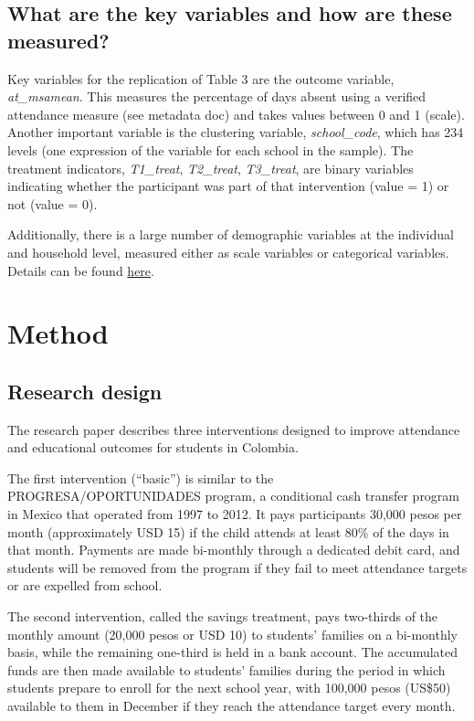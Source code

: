 \documentclass[
]{article}
\begin{document}
\hypertarget{what-are-the-key-variables-and-how-are-these-measured}{%
\subsection{What are the key variables and how are these
measured?}\label{what-are-the-key-variables-and-how-are-these-measured}}

Key variables for the replication of Table 3 are the outcome variable,
\emph{at\_msamean}. This measures the percentage of days absent using a
verified attendance measure (see metadata doc) and takes values between
0 and 1 (scale). Another important variable is the clustering variable,
\emph{school\_code}, which has 234 levels (one expression of the
variable for each school in the sample). The treatment indicators,
\emph{T1\_treat}, \emph{T2\_treat}, \emph{T3\_treat}, are binary
variables indicating whether the participant was part of that
intervention (value = 1) or not (value = 0).

Additionally, there is a large number of demographic variables at the
individual and household level, measured either as scale variables or
categorical variables. Details can be found
\href{./AEJApp_2010-0132_Data_ReadMe.pdf}{here}.

\hypertarget{method}{%
\section{Method}\label{method}}

\hypertarget{research-design}{%
\subsection{Research design}\label{research-design}}

The research paper describes three interventions designed to improve
attendance and educational outcomes for students in Colombia.

The first intervention (``basic'') is similar to the
PROGRESA/OPORTUNIDADES program, a conditional cash transfer program in
Mexico that operated from 1997 to 2012. It pays participants 30,000
pesos per month (approximately USD 15) if the child attends at least
80\% of the days in that month. Payments are made bi-monthly through a
dedicated debit card, and students will be removed from the program if
they fail to meet attendance targets or are expelled from school.

The second intervention, called the savings treatment, pays two-thirds
of the monthly amount (20,000 pesos or USD 10) to students' families on
a bi-monthly basis, while the remaining one-third is held in a bank
account. The accumulated funds are then made available to students'
families during the period in which students prepare to enroll for the
next school year, with 100,000 pesos (US\$50) available to them in
December if they reach the attendance target every month.
\end{document}
